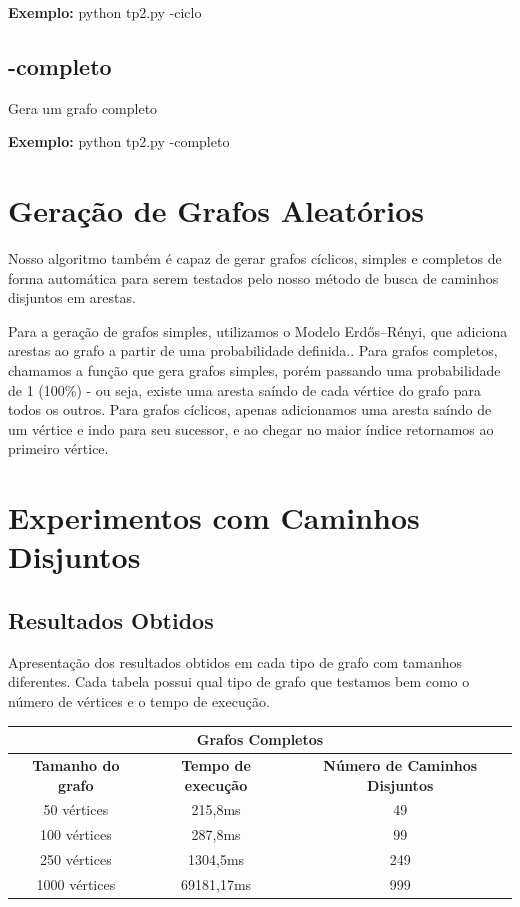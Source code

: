 \textbf{Exemplo:} python tp2.py -ciclo

\subsection {\esp -completo}
Gera um grafo completo

\textbf{Exemplo:} python tp2.py -completo

\section{\esp Geração de Grafos Aleatórios}

Nosso algoritmo também é capaz de gerar grafos cíclicos, simples e completos de forma automática para serem testados pelo nosso método de busca de caminhos disjuntos em arestas.

Para a geração de grafos simples, utilizamos o Modelo Erdős–Rényi, que adiciona arestas ao grafo a partir de uma probabilidade definida.\cite{Erdos:1959:pmd}. Para grafos completos, chamamos a função que gera grafos simples, porém passando uma probabilidade de 1 (100\%) - ou seja, existe uma aresta saíndo de cada vértice do grafo para todos os outros. Para grafos cíclicos, apenas adicionamos uma aresta saíndo de um vértice e indo para seu sucessor, e ao chegar no maior índice retornamos ao primeiro vértice.

\section{\esp Experimentos com Caminhos Disjuntos}



\subsection{\esp Resultados Obtidos}

Apresentação dos resultados obtidos em cada tipo de grafo com tamanhos diferentes. Cada tabela possui qual tipo de grafo que testamos bem como o número de vértices e o tempo de execução.

\begin{center}
\begin{tabular}{ |c|c|c| }
 \hline
 \multicolumn{3}{|c|}{\textbf{Grafos Completos}} \\
 \hline
 \textbf{Tamanho do grafo} & \textbf{Tempo de execução} & \textbf{Número de Caminhos Disjuntos} \\ 
 \hline
 50 vértices & 215,8ms & 49 \\  
 \hline
 100 vértices & 287,8ms & 99 \\
 \hline  
 250 vértices & 1304,5ms & 249 \\
 \hline  
 1000 vértices & 69181,17ms & 999 \\
 \hline  
\end{tabular}
\end{center}

